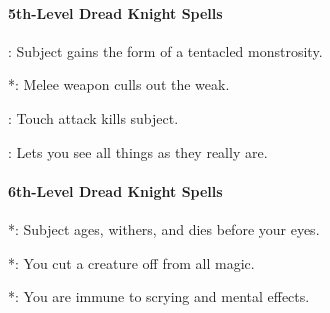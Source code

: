 \paragraph{5th-Level Dread Knight Spells}
\begin{list}{}{\leftmargin=1em}
\item {}: Subject gains the form of a tentacled monstrosity. %
\item {}*: Melee weapon culls out the weak. %
\item {}: Touch attack kills subject. %
\item {}: Lets you see all things as they really are.
\end{list}
\paragraph{6th-Level Dread Knight Spells}
\begin{list}{}{\leftmargin=1em}
\item {}*: Subject ages, withers, and dies before your eyes. %
\item {}*: You cut a creature off from all magic.%
\item {}*: You are immune to scrying and mental effects.
\end{list}